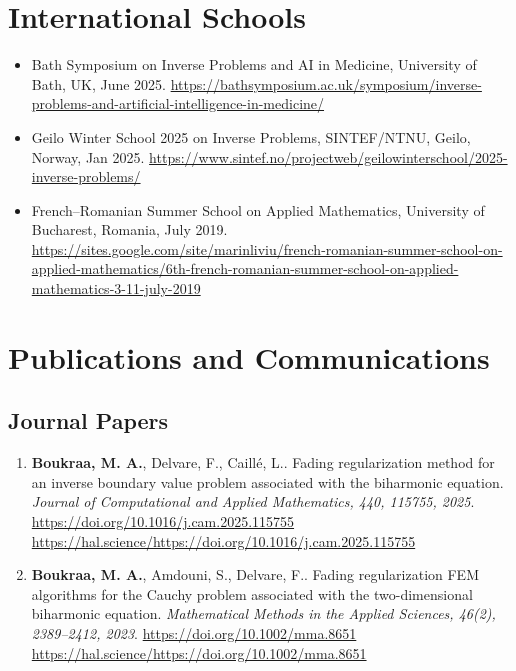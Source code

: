\documentclass[10pt]{article}
\begin{document}
\section*{International Schools}
\begin{itemize}
  \item Bath Symposium on Inverse Problems and AI in Medicine, University of Bath, UK, June 2025. \url{https://bathsymposium.ac.uk/symposium/inverse-problems-and-artificial-intelligence-in-medicine/}
  \item Geilo Winter School 2025 on Inverse Problems, SINTEF/NTNU, Geilo, Norway, Jan 2025. \url{https://www.sintef.no/projectweb/geilowinterschool/2025-inverse-problems/}
  \item French–Romanian Summer School on Applied Mathematics, University of Bucharest, Romania, July 2019. \url{https://sites.google.com/site/marinliviu/french-romanian-summer-school-on-applied-mathematics/6th-french-romanian-summer-school-on-applied-mathematics-3-11-july-2019}
\end{itemize}

\section{Publications and Communications}
\subsection{Journal Papers}
\begin{enumerate}
\item \textbf{Boukraa, M. A.}, Delvare, F., Caill{\'e}, L.. Fading regularization method for an inverse boundary value problem associated with the biharmonic equation. \textit{Journal of Computational and Applied Mathematics, 440, 115755, 2025}. \url{https://doi.org/10.1016/j.cam.2025.115755} \url{https://hal.science/https://doi.org/10.1016/j.cam.2025.115755}
\item \textbf{Boukraa, M. A.}, Amdouni, S., Delvare, F.. Fading regularization FEM algorithms for the Cauchy problem associated with the two-dimensional biharmonic equation. \textit{Mathematical Methods in the Applied Sciences, 46(2), 2389--2412, 2023}. \url{https://doi.org/10.1002/mma.8651} \url{https://hal.science/https://doi.org/10.1002/mma.8651}
\end{enumerate}
\end{document}
